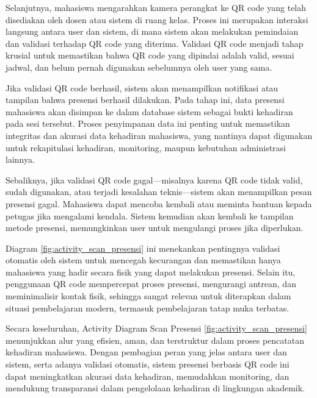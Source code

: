 \documentclass[a4paper,oneside,11pt]{book}
\begin{document}
Selanjutnya, mahasiswa mengarahkan kamera perangkat ke QR code yang telah disediakan oleh dosen atau sistem di ruang kelas. Proses ini merupakan interaksi langsung antara user dan sistem, di mana sistem akan melakukan pemindaian dan validasi terhadap QR code yang diterima. Validasi QR code menjadi tahap krusial untuk memastikan bahwa QR code yang dipindai adalah valid, sesuai jadwal, dan belum pernah digunakan sebelumnya oleh user yang sama.

Jika validasi QR code berhasil, sistem akan menampilkan notifikasi atau tampilan bahwa presensi berhasil dilakukan. Pada tahap ini, data presensi mahasiswa akan disimpan ke dalam database sistem sebagai bukti kehadiran pada sesi tersebut. Proses penyimpanan data ini penting untuk memastikan integritas dan akurasi data kehadiran mahasiswa, yang nantinya dapat digunakan untuk rekapitulasi kehadiran, monitoring, maupun kebutuhan administrasi lainnya.

Sebaliknya, jika validasi QR code gagal—misalnya karena QR code tidak valid, sudah digunakan, atau terjadi kesalahan teknis—sistem akan menampilkan pesan presensi gagal. Mahasiswa dapat mencoba kembali atau meminta bantuan kepada petugas jika mengalami kendala. Sistem kemudian akan kembali ke tampilan metode presensi, memungkinkan user untuk mengulangi proses jika diperlukan.

Diagram \ref{fig:activity_scan_presensi} ini menekankan pentingnya validasi otomatis oleh sistem untuk mencegah kecurangan dan memastikan hanya mahasiswa yang hadir secara fisik yang dapat melakukan presensi. Selain itu, penggunaan QR code mempercepat proses presensi, mengurangi antrean, dan meminimalisir kontak fisik, sehingga sangat relevan untuk diterapkan dalam situasi pembelajaran modern, termasuk pembelajaran tatap muka terbatas.

Secara keseluruhan, Activity Diagram Scan Presensi \ref{fig:activity_scan_presensi} menunjukkan alur yang efisien, aman, dan terstruktur dalam proses pencatatan kehadiran mahasiswa. Dengan pembagian peran yang jelas antara user dan sistem, serta adanya validasi otomatis, sistem presensi berbasis QR code ini dapat meningkatkan akurasi data kehadiran, memudahkan monitoring, dan mendukung transparansi dalam pengelolaan kehadiran di lingkungan akademik.
\end{document}
